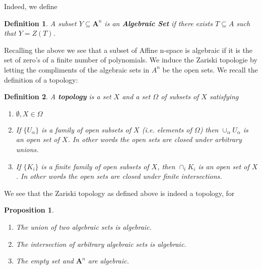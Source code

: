 \documentclass{report}
\providecommand{\A}{\textbf{A}}
\newtheorem{proposition}{Proposition}
\newtheorem{defi}{Definition}
\begin{document}
  Indeed, we define
  \begin{defi}
    A subset $Y\subseteq \A^n$ is an \textbf{Algebraic Set} if there exists $T\subseteq A$ such that $Y=Z(T)$.
  \end{defi}
  Recalling the above we see that a subset of Affine n-space is algebraic if it is the set of zero's of a finite number of polynomials. We induce the Zariski topologie by letting the compliments of the algebraic sets in $A^n$ be the open sets. We recall the definition of a topology:
  \begin{defi}
    A \textbf{topology} is a set $X$ and a set $\Omega$ of subsets of $X$ satisfying
    \begin{enumerate}
    \item $ \emptyset, X\in \Omega$
    \item If $\{U_\alpha\}$ is a family of open subsets of $X$ (i.e. elements of $\Omega$) then $\cup_\alpha U_\alpha$ is an open set of $X$. In other words the open sets are closed under arbitrary unions.
    \item If $\{K_i\}$ is a finite family of open subsets of $X$, then $\cap_i K_i$ is an open set of $X$. In other words the open sets are closed under finite intersections.
    \end{enumerate}
  \end{defi}
  We see that the Zariski topology as defined above is indeed a topology, for
  \begin{proposition}
    \begin{enumerate}
    \item The union of two algebraic sets is algebraic.
    \item The intersection of arbitrary algebraic sets is algebraic.
    \item The empty set and $\A^n$ are algebraic.
    \end{enumerate}
  \end{proposition}
\end{document}
